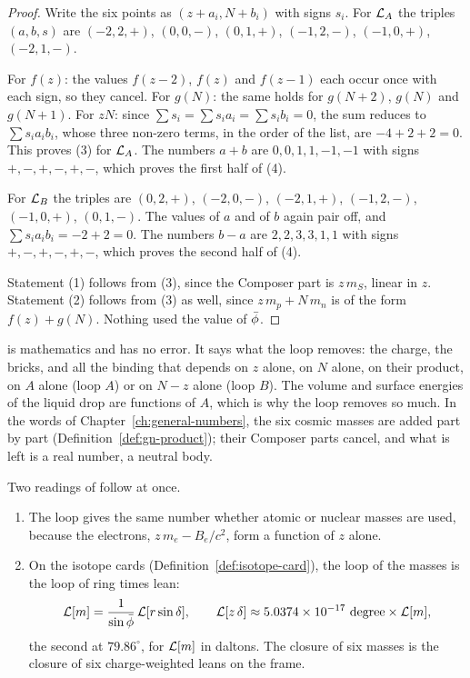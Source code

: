 \begin{proof}
Write the six points as $(z + a_i, N + b_i)$ with signs $s_i$. For $\mathcal{L}_A$ the triples $(a, b, s)$ are $(-2, 2, +)$, $(0, 0, -)$, $(0, 1, +)$, $(-1, 2, -)$, $(-1, 0, +)$, $(-2, 1, -)$.

For $f(z)$: the values $f(z-2)$, $f(z)$ and $f(z-1)$ each occur once with each sign, so they cancel. For $g(N)$: the same holds for $g(N+2)$, $g(N)$ and $g(N+1)$. For $zN$: since $\sum s_i = \sum s_i a_i = \sum s_i b_i = 0$, the sum reduces to $\sum s_i a_i b_i$, whose three non-zero terms, in the order of the list, are $-4 + 2 + 2 = 0$. This proves (3) for $\mathcal{L}_A$. The numbers $a + b$ are $0, 0, 1, 1, -1, -1$ with signs $+, -, +, -, +, -$, which proves the first half of (4).

For $\mathcal{L}_B$ the triples are $(0, 2, +)$, $(-2, 0, -)$, $(-2, 1, +)$, $(-1, 2, -)$, $(-1, 0, +)$, $(0, 1, -)$. The values of $a$ and of $b$ again pair off, and $\sum s_i a_i b_i = -2 + 2 = 0$. The numbers $b - a$ are $2, 2, 3, 3, 1, 1$ with signs $+, -, +, -, +, -$, which proves the second half of (4).

Statement (1) follows from (3), since the Composer part is $z\,m_S$, linear in $z$. Statement (2) follows from (3) as well, since $z\,m_p + N\,m_n$ is of the form $f(z) + g(N)$. Nothing used the value of $\bar{\phi}$.
\end{proof}

 is mathematics and has no error. It says what the loop removes: the charge, the bricks, and all the binding that depends on $z$ alone, on $N$ alone, on their product, on $A$ alone (loop $A$) or on $N - z$ alone (loop $B$). The volume and surface energies of the liquid drop are functions of $A$, which is why the loop removes so much. In the words of Chapter~\ref{ch:general-numbers}, the six cosmic masses are added part by part (Definition~\ref{def:gn-product}); their Composer parts cancel, and what is left is a real number, a neutral body.

\begin{remark}\label{rem:closure-cards}
Two readings of  follow at once.
\begin{enumerate}
  \item The loop gives the same number whether atomic or nuclear masses are used, because the electrons, $z\,m_e - B_e/c^2$, form a function of $z$ alone.
  \item On the isotope cards (Definition~\ref{def:isotope-card}), the loop of the masses is the loop of ring times lean:
  \[
  \mathcal{L}[m] = \frac{1}{\sin\bar{\phi}}\,\mathcal{L}[r\sin\delta], \qquad \mathcal{L}[z\,\delta] \approx 5.0374 \times 10^{-17}\ \text{degree} \times \mathcal{L}[m],
  \]
  the second at $79.86^\circ$, for $\mathcal{L}[m]$ in daltons. The closure of six masses is the closure of six charge-weighted leans on the frame.
\end{enumerate}
\end{remark}

